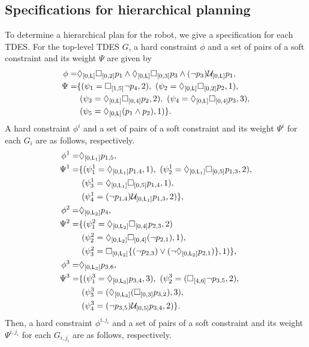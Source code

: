 \documentclass[journal,twoside,web]{IEEEtran}
\newcommand{\Len}{{\sf L}}
\newcommand{\U}[1]{\mathcal{U}_{[#1]}}
\newcommand{\F}[1]{\Diamond_{[#1]}}
\newcommand{\G}[1]{\Box_{[#1]}}
\begin{document}
\subsection{Specifications for hierarchical planning}
%
To determine a hierarchical plan for the robot, we give a specification for each TDES.
For the top-level TDES $G$, a hard constraint $\phi$ and a set of pairs of a soft constraint and its weight $\Psi$ are given by
\begin{align}
\phi=&\F{0,\Len}\G{0,2}p_1\land \F{0,\Len}\G{0,3}p_3\land (\lnot p_3)\U{0,\Len}p_1, \notag \\
\Psi=&\{
(\psi_1=\G{1,5}\lnot p_4, 2), ~
(\psi_2=\F{0,\Len}\G{0,2}p_2, 1),\notag\\&~
(\psi_3=\F{0,\Len}\G{0,4}p_2, 2),~
(\psi_4=\F{0,\Len}\G{0,4}p_3, 3),\notag\\&~
(\psi_5=\F{0,\Len}(p_1\land p_2),1)
\}.\notag
\end{align}
%
A hard constraint $\phi^i$ and a set of pairs of a soft constraint and its weight $\Psi^i$ for each $G_i$ are as follows, respectively.
\begin{align}
\phi^1=&\F{0,\Len_1}p_{1,5},\notag \\
\Psi^1 
=&\{
(\psi^1_{1} =\F{0,\Len_1}p_{1,4}, 1),~
(\psi^1_{2} =\F{0,\Len_1}\G{0,5}p_{1,3},2),\notag\\
&~(\psi^1_{3} =\F{0,\Len_1}\G{0,5}p_{1,4},1), \notag\\
&~(\psi^1_{4} =(\lnot p_{1,4}) \U{0,\Len_1}p_{1,3}, 2)
\} ,\notag
\\
\phi^2=&\F{0,\Len_2}p_{4},\notag \\
\Psi^2
=&\{
(\psi^2_{1}=\F{0,\Len_2}\G{0,4}p_{2,3},2)\notag\\
&~
(\psi^2_{2}=\F{0,\Len_2}\G{0,4}(\lnot p_{2,1}),1),\notag\\
&~(\psi^2_{3}=\G{0,\Len_2}\{(\lnot p_{2,3}) \lor (\lnot\F{0,\Len_2}p_{2,1})\},1)
\},\notag
\\ %
\phi^{3}=&\F{0,\Len_3}p_{3,6},\notag \\
\Psi^3
=&\{
(\psi^3_{1}=\F{0,\Len_3}p_{3,4}, 3),~
(\psi^3_{2}=(\G{4,6}\lnot p_{3,5}, 2),\notag \\&~
(\psi^3_{3}=(\F{0,\Len_3}(\G{0,3}p_{3,2}), 3),\notag \\&~
(\psi^3_{4}=(\lnot p_{3,5})\U{0,5}p_{3,4}, 2)
\} .
\notag
\end{align}
%
Then, a hard constraint $\phi^{i,{j_i}}$ and a set of pairs of a soft constraint and its weight $\Psi^{i,{j_i}}$ for each $G_{i,{j_i}}$ are as follows, respectively.
\end{document}
